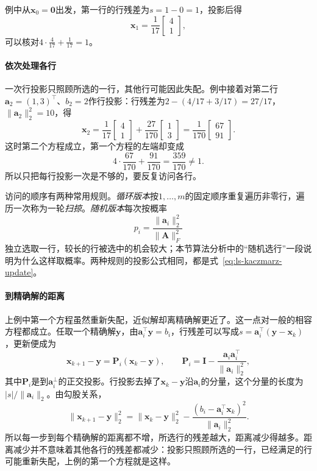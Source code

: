 例中从$\bm x_0=\bm0$出发，第一行的行残差为$s=1-0=1$，投影后得
\[
 \bm x_1=\frac1{17}\begin{bmatrix}4\\1\end{bmatrix},
\]
可以核对$4\cdot\tfrac4{17}+\tfrac1{17}=1$。

\paragraph{依次处理各行}
一次行投影只照顾所选的一行，其他行可能因此失配。例中接着对第二行$\bm a_2=(1,3)^\top$、$b_2=2$作行投影：行残差为$2-(4/17+3/17)=27/17$，$\lVert\bm a_2\rVert_2^2=10$，得
\[
 \bm x_2=\frac1{17}\begin{bmatrix}4\\1\end{bmatrix}+\frac{27}{170}\begin{bmatrix}1\\3\end{bmatrix}=\frac1{170}\begin{bmatrix}67\\91\end{bmatrix}.
\]
这时第二个方程成立，第一个方程的左端却变成
\[
 4\cdot\frac{67}{170}+\frac{91}{170}=\frac{359}{170}\neq1 .
\]
所以只把每行投影一次是不够的，要反复访问各行。

访问的顺序有两种常用规则。\emph{循环版本}按$1,\ldots,m$的固定顺序重复遍历非零行，遍历一次称为一轮\emph{扫掠}。\emph{随机版本}每次按概率
\begin{equation}
 p_i=\frac{\lVert\bm a_i\rVert_2^2}{\lVert\bm A\rVert_F^2}
 \label{eq:ls-kaczmarz-row-probability}
\end{equation}
独立选取一行，较长的行被选中的机会较大；本节算法分析中的“随机选行”一段说明为什么这样取概率。两种规则的投影公式相同，都是式~\eqref{eq:ls-kaczmarz-update}。

\paragraph{到精确解的距离}
上例中第一个方程虽然重新失配，近似解却离精确解更近了。这一点对一般的相容方程都成立。任取一个精确解$\bm y$，由$\bm a_i^\top\bm y=b_i$，行残差可以写成$s=\bm a_i^\top(\bm y-\bm x_k)$，更新便成为
\begin{equation}
 \bm x_{k+1}-\bm y=\bm P_i(\bm x_k-\bm y),\qquad \bm P_i=\bm I-\frac{\bm a_i\bm a_i^\top}{\lVert\bm a_i\rVert_2^2},
 \label{eq:ls-kaczmarz-error-map}
\end{equation}
其中$\bm P_i$是到$\bm a_i^\perp$的正交投影。行投影去掉了$\bm x_k-\bm y$沿$\bm a_i$的分量，这个分量的长度为$|s|/\lVert\bm a_i\rVert_2$。由勾股关系，
\begin{equation}
 \lVert\bm x_{k+1}-\bm y\rVert_2^2=\lVert\bm x_k-\bm y\rVert_2^2-\frac{(b_i-\bm a_i^\top\bm x_k)^2}{\lVert\bm a_i\rVert_2^2}.
 \label{eq:ls-kaczmarz-distance}
\end{equation}
所以每一步到每个精确解的距离都不增，所选行的残差越大，距离减少得越多。距离减少并不意味着其他各行的残差都减少：投影只照顾所选的一行，已经满足的行可能重新失配，上例的第一个方程就是这样。


